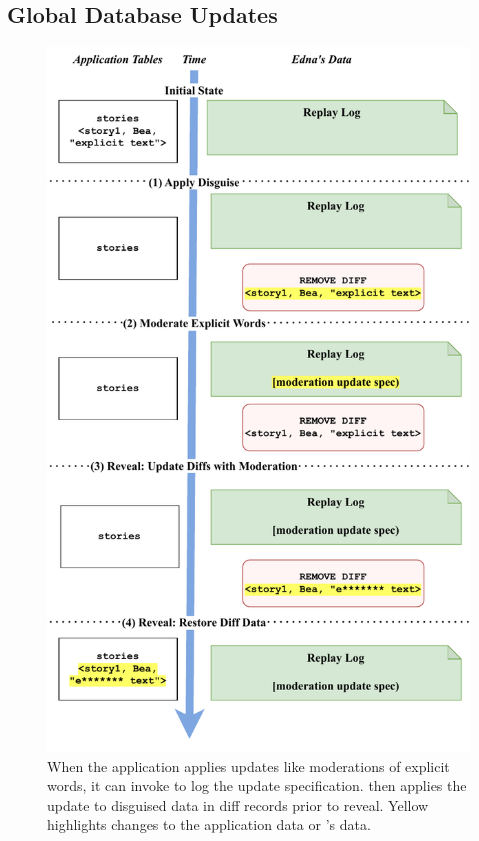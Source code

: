 %
\subsection{Global Database Updates}
\label{s:design:updates}

\begin{figure}
    \centering
    \includegraphics[width=.8\textwidth]{figs/update-moderation}
    \caption{When the application applies updates like moderations of explicit
    words, it can invoke \sys to log the update specification. \sys then applies the
    update to disguised data in diff records prior to reveal. Yellow 
    highlights changes to the application data or \sys's data.}
\label{f:update:mod}
\end{figure}

